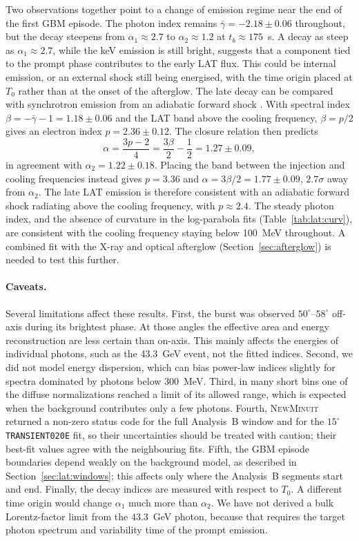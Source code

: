 Two observations together point to a change of emission regime near the end of the first GBM episode. The photon
index remains $\bar{\gamma} = -2.18 \pm 0.06$ throughout, but the decay steepens from
$\alpha_1 \approx 2.7$ to $\alpha_2 \approx 1.2$ at $t_b \approx 175$~s. A decay as steep as
$\alpha_1 \approx 2.7$, while the keV emission is still bright, suggests that a component tied to the prompt
phase contributes to the early LAT flux. This could be internal emission, or an external shock still being
energised, with the time origin placed at $T_0$ rather than at the onset of the afterglow. The late decay can be
compared with synchrotron emission from an adiabatic forward shock \citep[e.g.][]{Kumar2009, Kumar2010}.
With spectral index $\beta = -\bar{\gamma} - 1 = 1.18 \pm 0.06$ and the LAT band above the cooling frequency,
$\beta = p/2$ gives an electron index $p = 2.36 \pm 0.12$. The closure relation then predicts
\begin{equation}
  \alpha = \frac{3p - 2}{4} = \frac{3\beta}{2} - \frac{1}{2} = 1.27 \pm 0.09,
  \label{eq:closure}
\end{equation}
in agreement with $\alpha_2 = 1.22 \pm 0.18$. Placing the band between the injection and cooling frequencies instead
gives $p = 3.36$ and $\alpha = 3\beta/2 = 1.77 \pm 0.09$, $2.7\sigma$ away from $\alpha_2$. The late LAT emission is
therefore consistent with an adiabatic forward shock radiating above the cooling frequency, with $p \approx 2.4$.
The steady photon index, and the absence of curvature in the log-parabola fits
(Table~\ref{tab:lat:curv}), are consistent with the cooling frequency staying below 100~MeV throughout. A combined fit with the
X-ray and optical afterglow (Section~\ref{sec:afterglow}) is needed to test this further.

\paragraph{Caveats.}
Several limitations affect these results. First, the burst was observed $50^\circ$--$58^\circ$ off-axis
during its brightest phase. At those angles the effective area and energy reconstruction are less certain than
on-axis. This mainly affects the energies of individual photons, such as the 43.3~GeV event, not the fitted indices.
Second, we did not model energy dispersion, which can bias power-law indices slightly for spectra dominated by
photons below 300~MeV. Third, in many short bins one of the diffuse normalizations reached a limit of its allowed
range, which is expected when the background contributes only a few photons. Fourth, \textsc{NewMinuit} returned a
non-zero status code for the full Analysis~B window and for the $15^\circ$ \texttt{TRANSIENT020E} fit, so their
uncertainties should be treated with caution; their best-fit values agree with the neighbouring fits. Fifth, the GBM episode
boundaries depend weakly on the background model, as described in Section~\ref{sec:lat:windows}; this affects only
where the Analysis~B segments start and end. Finally, the decay indices are measured with respect to $T_0$. A
different time origin would change $\alpha_1$ much more than $\alpha_2$. We have not derived a bulk Lorentz-factor
limit from the 43.3~GeV photon, because that requires the target photon spectrum and variability time of the
prompt emission.
